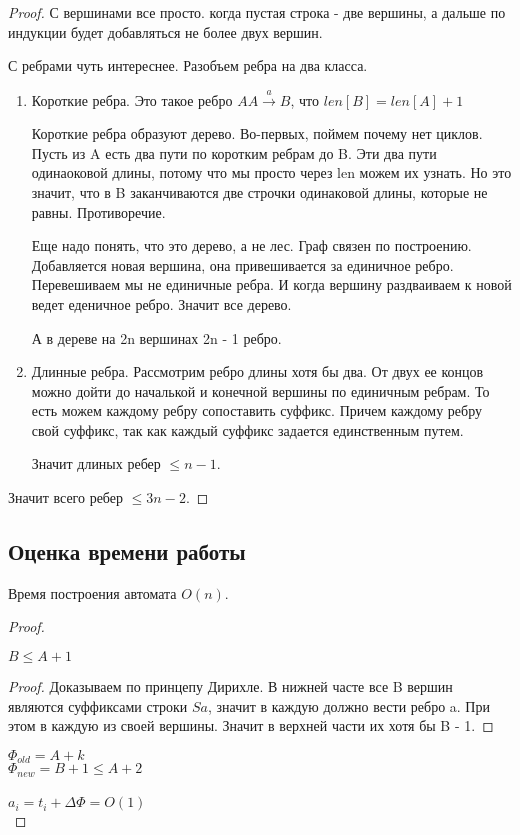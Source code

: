 \begin{proof}
С вершинами все просто. когда пустая строка - две вершины, а дальше по индукции будет добавляться 
не более двух вершин. 

С ребрами чуть интереснее. Разобъем ребра на два класса. 
\begin{enumerate}
    \item Короткие ребра. Это такое ребро $A A \overset{a}{\rightarrow} B$, что $len[B] = len[A] + 1$

    Короткие ребра образуют дерево. Во-первых, поймем почему нет циклов. Пусть из A есть два пути по коротким ребрам 
    до B. Эти два пути одинаоковой длины, потому что мы просто через len можем их узнать. Но это 
    значит, что в B заканчиваются две строчки одинаковой длины, которые не равны. Противоречие.

    Еще надо понять, что это дерево, а не лес. Граф связен по построению. Добавляется новая вершина, 
    она привешивается за единичное ребро. Перевешиваем мы не единичные ребра. И когда вершину раздваиваем к новой 
    ведет еденичное ребро. Значит все дерево. 

    А в дереве на 2n вершинах 2n - 1 ребро. 
    \item Длинные ребра. Рассмотрим ребро длины хотя бы два. От двух ее концов можно 
    дойти до началькой и конечной вершины по единичным ребрам. То есть можем каждому ребру сопоставить 
    суффикс. Причем каждому ребру свой суффикс, так как каждый суффикс задается единственным путем. 

    Значит длиных ребер $\le n - 1$. 
\end{enumerate}
Значит всего ребер $\le 3n - 2$.
\end{proof}
\subsection{Оценка времени работы}
\begin{theorem}
Время построения автомата $O(n)$.
\end{theorem}
\begin{proof}

\begin{lemma}
$B \le A + 1$
\end{lemma}

\begin{proof}
   Доказываем по принцепу Дирихле. В нижней часте все B вершин 
   являются суффиксами строки $Sa$, значит в каждую должно вести ребро a. 
   При этом в каждую из своей вершины. Значит в верхней части их хотя 
   бы B - 1.
\end{proof}

$\Phi_{old} = A + k$ \\
$\Phi_{new} = B + 1 \le A + 2$\\
\\
$a_i = t_i + \Delta \Phi = O(1)$\\

\end{proof}



